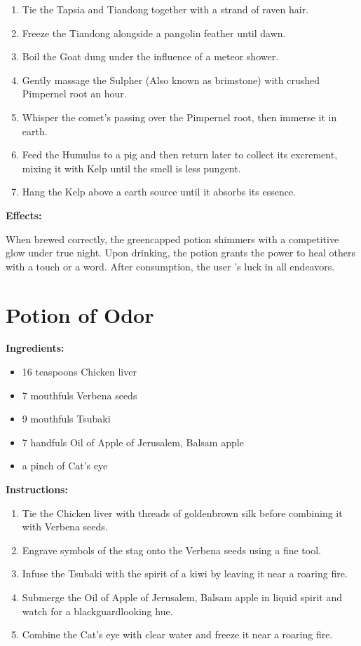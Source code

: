 \documentclass{article}
\begin{document}
\begin{enumerate}
  \item Tie the Tapsia and Tiandong together with a strand of raven hair.
  \item Freeze the Tiandong alongside a pangolin feather until dawn.
  \item Boil the Goat dung under the influence of a meteor shower.
  \item Gently massage the Sulpher (Also known as brimstone) with crushed Pimpernel root an hour.
  \item Whisper the comet’s passing over the Pimpernel root, then immerse it in earth.
  \item Feed the Humulus to a pig and then return later to collect its excrement, mixing it with Kelp until the smell is less pungent.
  \item Hang the Kelp above a earth source until it absorbs its essence.
\end{enumerate}

\textbf{Effects:}

When brewed correctly, the greencapped potion shimmers with a competitive glow under true night. Upon drinking, the potion grants the power to heal others with a touch or a word. After consumption, the user 's luck in all endeavors.

\newpage
\section*{Potion of Odor}

\textbf{Ingredients:}

\begin{itemize}
  \item 16 teaspoons Chicken liver
  \item 7 mouthfuls Verbena seeds
  \item 9 mouthfuls Tsubaki
  \item 7 handfuls Oil of Apple of Jerusalem, Balsam apple
  \item a pinch of Cat's eye
\end{itemize}

\textbf{Instructions:}

\begin{enumerate}
  \item Tie the Chicken liver with threads of goldenbrown silk before combining it with Verbena seeds.
  \item Engrave symbols of the stag onto the Verbena seeds using a fine tool.
  \item Infuse the Tsubaki with the spirit of a kiwi by leaving it near a roaring fire.
  \item Submerge the Oil of Apple of Jerusalem, Balsam apple in liquid spirit and watch for a blackguardlooking hue.
  \item Combine the Cat's eye with clear water and freeze it near a roaring fire.
\end{enumerate}
\end{document}
